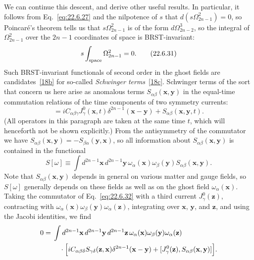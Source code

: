 We can continue this descent, and derive other useful results. In
particular, it follows from Eq.~\eqref{eq:22.6.27} and the nilpotence of
$s$ that $d(s\Omega^2_{2n-1})=0$, so Poincaré's theorem tells us that
$s\Omega^2_{2n-1}$ is of the form $d\Omega^3_{2n-2}$, so the integral of
$\Omega^2_{2n-1}$ over the $2n-1$ coordinates of space is BRST-invariant:
\begin{equation}
 s\int_{\rm space}\Omega^2_{2n-1}=0.
 \tag{22.6.31}\label{eq:22.6.31}
\end{equation}
Such BRST-invariant functionals of second order in the ghost fields are
candidates~\hyperref[ch22-ref-18b]{[18b]} for so-called
\emph{Schwinger terms}~\hyperref[ch22-ref-18c]{[18c]}. Schwinger terms of
the sort that concern us here arise as anomalous terms
$S_{\alpha\beta}(\mathbf x,\mathbf y)$ in the equal-time commutation
relations of the time components of two symmetry currents:
\begin{equation}
 [J^0_\alpha(\mathbf x,t),J^0_\beta(\mathbf y,t)]
 =iC_{\alpha\beta\gamma}J^0_\gamma(\mathbf x,t)
 \delta^{2n-1}(\mathbf x-\mathbf y)
 +S_{\alpha\beta}(\mathbf x,\mathbf y,t).
 \tag{22.6.32}\label{eq:22.6.32}
\end{equation}
(All operators in this paragraph are taken at the same time $t$, which
will henceforth not be shown explicitly.) From the antisymmetry of the
commutator we have
$S_{\alpha\beta}(\mathbf x,\mathbf y)
=-S_{\beta\alpha}(\mathbf y,\mathbf x)$, so all information about
$S_{\alpha\beta}(\mathbf x,\mathbf y)$ is contained in the functional
\begin{equation}
 S[\omega]\equiv\int d^{2n-1}\mathbf x\,d^{2n-1}\mathbf y\,
 \omega_\alpha(\mathbf x)\omega_\beta(\mathbf y)
 S_{\alpha\beta}(\mathbf x,\mathbf y).
 \tag{22.6.33}\label{eq:22.6.33}
\end{equation}
Note that $S_{\alpha\beta}(\mathbf x,\mathbf y)$ depends in general on
various matter and gauge fields, so $S[\omega]$ generally depends on these
fields as well as on the ghost field $\omega_\alpha(\mathbf x)$. Taking the
commutator of Eq.~\eqref{eq:22.6.32} with a third current
$J^0_\gamma(\mathbf z)$, contracting with
$\omega_\alpha(\mathbf x)\omega_\beta(\mathbf y)\omega_\alpha(\mathbf z)$,
integrating over $\mathbf x$, $\mathbf y$, and $\mathbf z$, and using the
Jacobi identities, we find
\[
 \begin{aligned}
 0={}&\int d^{2n-1}\mathbf x\,d^{2n-1}\mathbf y\,
 d^{2n-1}\mathbf z\,
 \omega_\alpha(\mathbf x)\omega_\beta(\mathbf y)
 \omega_\alpha(\mathbf z)
 \\
 &\quad{}\cdot\Bigl[
 iC_{\alpha\beta\delta}
 S_{\gamma\delta}(\mathbf z,\mathbf x)
 \delta^{2n-1}(\mathbf x-\mathbf y)
 +[J^0_\gamma(\mathbf z),
 S_{\alpha\beta}(\mathbf x,\mathbf y)]
 \Bigr].
 \end{aligned}
\]
